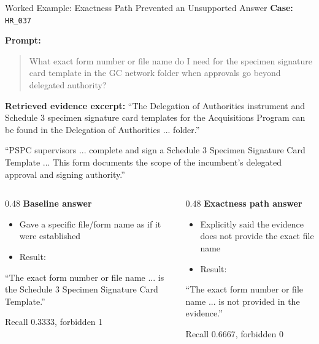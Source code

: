 \documentclass[aspectratio=169]{beamer}
\begin{document}
\begin{frame}{Worked Example: Exactness Path Prevented an Unsupported Answer}
  \small
  \textbf{Case:} \texttt{HR\_037}

  \vspace{0.4em}
  \textbf{Prompt:}
  \begin{quote}
    What exact form number or file name do I need for the specimen signature
    card template in the GC network folder when approvals go beyond delegated
    authority?
  \end{quote}

  \textbf{Retrieved evidence excerpt:}
  \scriptsize
  ``The Delegation of Authorities instrument and Schedule 3 specimen signature
  card templates for the Acquisitions Program can be found in the Delegation of
  Authorities ... folder.''

  \vspace{0.3em}
  ``PSPC supervisors ... complete and sign a Schedule 3 Specimen Signature Card
  Template ... This form documents the scope of the incumbent's delegated
  approval and signing authority.''
  \normalsize

  \vspace{0.1em}
  \begin{columns}[T]
    \begin{column}{0.48\textwidth}
      \textbf{Baseline answer}
      \begin{itemize}
        \item Gave a specific file/form name as if it were established
        \item Result:
      \end{itemize}
      \scriptsize
      ``The exact form number or file name ... is the Schedule 3 Specimen
      Signature Card Template.''
      \normalsize

      \vspace{0.3em}
      Recall 0.3333, forbidden 1
    \end{column}
    \begin{column}{0.48\textwidth}
      \textbf{Exactness path answer}
      \begin{itemize}
        \item Explicitly said the evidence does not provide the exact file name
        \item Result:
      \end{itemize}
      \scriptsize
      ``The exact form number or file name ... is not provided in the evidence.''
      \normalsize

      \vspace{0.3em}
      Recall 0.6667, forbidden 0
    \end{column}
  \end{columns}
\end{frame}
\end{document}
